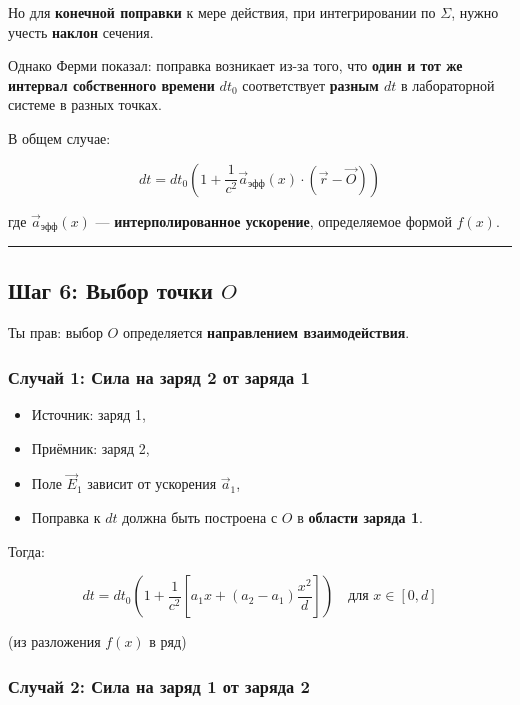 \documentclass[11pt]{article}
\providecommand{\tightlist}{%
      \setlength{\itemsep}{0pt}\setlength{\parskip}{0pt}}
\begin{document}
Но для \textbf{конечной поправки} к мере действия, при интегрировании по
\(\Sigma\), нужно учесть \textbf{наклон} сечения.

Однако Ферми показал: поправка возникает из-за того, что \textbf{один и
тот же интервал собственного времени} \(dt_0\) соответствует
\textbf{разным \(dt\)} в лабораторной системе в разных точках.

В общем случае:

\[
\boxed{
dt = dt_0 \left( 1 + \frac{1}{c^2} \vec{a}_{\text{эфф}}(x) \cdot (\vec{r} - \vec{O}) \right)
}
\]

где \(\vec{a}_{\text{эфф}}(x)\) --- \textbf{интерполированное
ускорение}, определяемое формой \(f(x)\).

\begin{center}\rule{0.5\linewidth}{\linethickness}\end{center}

\subsection{\texorpdfstring{ Шаг 6: Выбор точки
\(O\)}{ Шаг 6: Выбор точки O}}

Ты прав: выбор \(O\) определяется \textbf{направлением взаимодействия}.

\subsubsection{Случай 1: Сила на заряд 2 от заряда 1}

\begin{itemize}
\tightlist
\item
  Источник: заряд 1,
\item
  Приёмник: заряд 2,
\item
  Поле \(\vec{E}_1\) зависит от ускорения \(\vec{a}_1\),
\item
  Поправка к \(dt\) должна быть построена с \(O\) в \textbf{области
  заряда 1}.
\end{itemize}

Тогда:

\[
dt = dt_0 \left( 1 + \frac{1}{c^2} \left[ a_1 x + (a_2 - a_1) \frac{x^2}{d} \right] \right)
\quad \text{для } x \in [0, d]
\]

(из разложения \(f(x)\) в ряд)

\subsubsection{Случай 2: Сила на заряд 1 от заряда 2}
\end{document}
